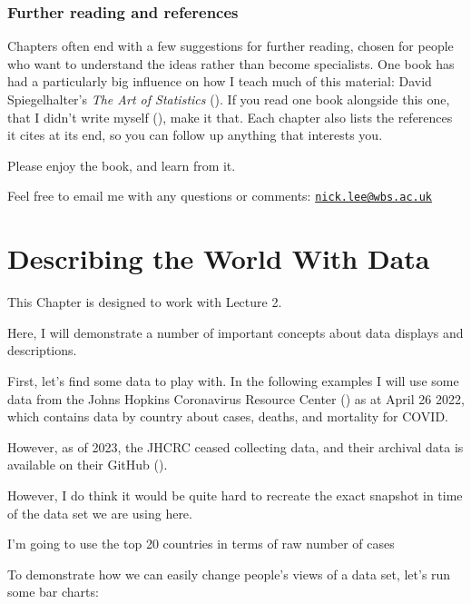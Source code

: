 \documentclass[
]{book}
\begin{document}
\subsection{Further reading and references}\label{further-reading-and-references}

Chapters often end with a few suggestions for further reading, chosen for people who want to understand the ideas rather than become specialists. One book has had a particularly big influence on how I teach much of this material: David Spiegelhalter's \emph{The Art of Statistics} (). If you read one book alongside this one, that I didn't write myself (), make it that. Each chapter also lists the references it cites at its end, so you can follow up anything that interests you.

Please enjoy the book, and learn from it.

Feel free to email me with any questions or comments: \href{mailto:nick.lee@wbs.ac.uk}{\nolinkurl{nick.lee@wbs.ac.uk}}

\chapter{Describing the World With Data}\label{intro}

This Chapter is designed to work with Lecture 2.

Here, I will demonstrate a number of important concepts about data displays and descriptions.

First, let's find some data to play with. In the following examples I will use some data from the Johns Hopkins Coronavirus Resource Center () as at April 26 2022, which contains data by country about cases, deaths, and mortality for COVID.

However, as of 2023, the JHCRC ceased collecting data, and their archival data is available on their GitHub ().

However, I do think it would be quite hard to recreate the exact snapshot in time of the data set we are using here.

I'm going to use the top 20 countries in terms of raw number of cases

To demonstrate how we can easily change people's views of a data set, let's run some bar charts:
\end{document}
